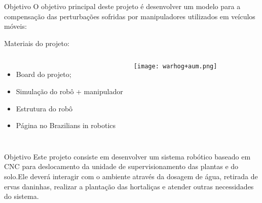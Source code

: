 \begin{frame}[t]{Objetivo} 
   O objetivo principal deste projeto é desenvolver um modelo para a compensação das perturbações sofridas por manipuladores utilizados em veículos móveis:
   \vspace*{0.3cm}

   Materiais do projeto:
   
        \begin{columns}[c]
            \begin{itemize}
                \item Board do projeto;
                \item Simulação do robô + manipulador
                \item Estrutura do robô
                \item Página no Brazilians in robotics
            \end{itemize}
                \texttt{[image: warhog+aum.png]}
        \end{columns}

\end{frame}
\begin{frame}[c]{} 
   
    \begin{center}
    \end{center}
       
\end{frame}
%
\begin{frame}[t]{Objetivo} 
    Este projeto consiste em desenvolver um sistema robótico baseado em CNC para deslocamento da unidade de supervisionamento das plantas e do solo.Ele deverá interagir com o ambiente através da dosagem de água, retirada de ervas daninhas, realizar a plantação das hortaliças e atender outras necessidades do sistema.


\end{frame}

